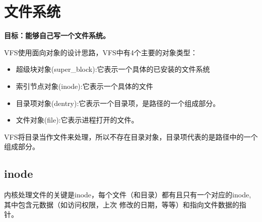 \chapter{文件系统}


\textbf{目标：能够自己写一个文件系统。}

VFS使用面向对象的设计思路，VFS中有4个主要的对象类型：

\begin{itemize}
\item 超级块对象(super\_block):它表示一个具体的已安装的文件系统
\item 索引节点对象(inode):它表示一个具体的文件
\item 目录项对象(dentry):它表示一个目录项，是路径的一个组成部分。
\item 文件对象(file):它表示进程打开的文件。
\end{itemize}

VFS将目录当作文件来处理，所以不存在目录对象，目录项代表的是路径中的一个组成部分。

\section{inode}

内核处理文件的关键是inode，每个文件（和目录）都有且只有一个对应的inode,其中包含元数据（如访问权限，上次
修改的日期，等等）和指向文件数据的指针。

